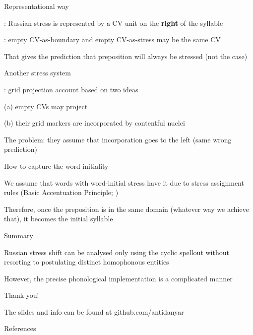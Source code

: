 \documentclass{beamer}
\begin{document}
	\begin{frame}{Representational way}

		\textcite{Enguehard:2016}: Russian stress is represented by a CV unit on the \textbf{right} of the syllable

		\textcite{Enguehard:2014}: empty CV-as-boundary and empty CV-as-stress may be the same CV
		
 		That gives the prediction that preposition will always be stressed (not the case)

	\end{frame}

	\begin{frame}{Another stress system}

		\textcite{Faust:2018}: grid projection account based on two ideas

		(a) empty CVs may project

		(b) their grid markers are incorporated by contentful nuclei

		The problem: they assume that incorporation goes to the left (same wrong prediction)

	\end{frame}

	\begin{frame}{How to capture the word-initiality}

		We assume that words with word-initial stress have it due to stress assignment rules (Basic Accentuation Principle; \cite{Melvold:1989})

	Therefore, once the preposition is in the same domain (whatever way we achieve that), it becomes the initial syllable

	\end{frame}

	\begin{frame}{Summary}

		Russian stress shift can be analysed only using the cyclic spellout without resorting to postulating distinct homophonous entities

		However, the precise phonological implementation is a complicated manner

	\end{frame}

	\begin{frame}

		Thank you!

		The slides and info can be found at github.com/antidanyar

	\end{frame}

	\begin{frame}[allowframebreaks]{References}
		\printbibliography[heading=none]
	\end{frame}
\end{document}
